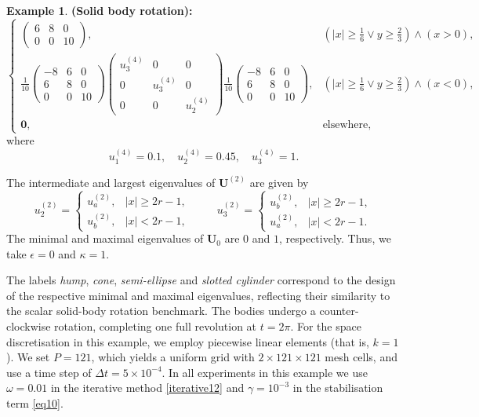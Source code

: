 \documentclass[final,12pt]{amsart}
\theoremstyle{plain}
\theoremstyle{definition}
\newtheorem{example}{Example}
\begin{document}
\begin{example}{\bf (Solid body rotation):}
\[\begin{cases}
\begin{pmatrix}
		6 & 8 & 0 \\
		0 & 0 & 10
	\end{pmatrix}, & (|x| \geq \frac{1}{6} \vee y \geq \frac{2}{3}) \wedge (x > 0), \\[0.2cm]
	\frac{1}{10}
	\begin{pmatrix}
		-8 & 6 & 0 \\
		6 & 8 & 0 \\
		0 & 0 & 10
	\end{pmatrix}
	\begin{pmatrix}
		u_3^{(4)} & 0 & 0 \\
		0 & u_3^{(4)} & 0 \\
		0 & 0 & u_2^{(4)}
	\end{pmatrix}
	\frac{1}{10}
	\begin{pmatrix}
		-8 & 6 & 0 \\
		6 & 8 & 0 \\
		0 & 0 & 10
	\end{pmatrix}, & (|x| \geq \frac{1}{6} \vee y \geq \frac{2}{3}) \wedge (x < 0), \\[0.2cm]
	\mathbf{0}, & \text{elsewhere},
\end{cases}
\]
where
\[
u_1^{(4)} = 0.1, \quad u_2^{(4)} = 0.45, \quad u_3^{(4)} = 1.
\]

The intermediate and largest eigenvalues of $\mathbf{U}^{(2)}$ are given by
\[
u_2^{(2)} =
\begin{cases}
	u_a^{(2)}, & |x| \geq 2r - 1, \\
	u_b^{(2)}, & |x| < 2r - 1,
\end{cases}
\hspace{1cm}
u_3^{(2)} =
\begin{cases}
	u_b^{(2)}, & |x| \geq 2r - 1, \\
	u_a^{(2)}, & |x| < 2r - 1.
\end{cases}
\]
The minimal and maximal eigenvalues of $\mathbf{U}_0$ are $0$ and $1$, respectively. Thus, we take $\epsilon=0$ and $\kappa=1$.

The labels \emph{hump}, \emph{cone}, \emph{semi-ellipse} and \emph{slotted cylinder} correspond to the design of the respective minimal and maximal eigenvalues,
reflecting their similarity to the scalar solid-body rotation benchmark.
The bodies undergo a counter-clockwise rotation, completing one full revolution at $t = 2\pi$.
For the space discretisation in this example, we employ piecewise linear elements (that is, $k=1$).
We set $P = 121$, which yields a uniform grid with $2\times 121\times 121$ mesh cells,
and use a time step of $\Delta t = 5\times 10^{-4}$. In all experiments in this example we use $\omega=0.01$ in the iterative method \eqref{iterative12} and $\gamma=10^{-3}$ in the stabilisation term \eqref{eq10}.


\end{example}
\end{document}
